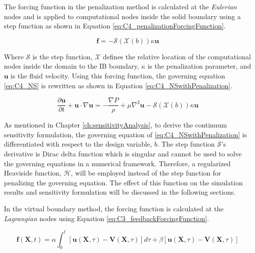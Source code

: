 The forcing function in the penalization method is calculated at the \emph{Eulerian} nodes and is applied to computational nodes inside the solid boundary using a step function as shown in Equation \eqref{eq:C4_penalizationForcingFunction}.

\begin{equation}\label{eq:C4_penalizationForcingFunction}
    \mathbf{f} = -\mathcal{S}(\mathcal{X}(b)) \kappa \mathbf{u}
\end{equation}

Where $\mathcal{S}$ is the step function, $\mathcal{X}$ defines the relative location of the computational nodes inside the domain to the IB boundary, $\kappa$ is the penalization parameter, and $\mathbf{u}$ is the fluid velocity. Using this forcing function, the governing equation \eqref{eq:C4_NS} is rewritten as shown in Equation \eqref{eq:C4_NSwithPenalization}.

\begin{equation}\label{eq:C4_NSwithPenalization}
    \frac{\partial \mathbf{u}}{\partial t} + \mathbf{u} \cdot \nabla \mathbf{u} = 
    -\frac{\nabla P}{\rho} + \mu \nabla^2 \mathbf{u} -\mathcal{S}(\mathcal{X}(b)) \kappa \mathbf{u}
\end{equation}

As mentioned in Chapter \ref{ch:sensitivityAnalysis}, to derive the continuum sensitivity formulation, the governing equation of \eqref{eq:C4_NSwithPenalization} is differentiated with respect to the design variable, $b$. The step function $\mathcal{S}$'s derivative is Dirac delta function which is singular and cannot be used to solve the governing equations in a numerical framework. Therefore, a regularized Heaviside function, $\mathcal{H}$, will be employed instead of the step function for penalizing the governing equation. The effect of this function on the simulation results and sensitivity formulation will be discussed in the following sections.

In the virtual boundary method, the forcing function is calculated at the \emph{Lagrangian} nodes using Equation \eqref{eq:C3_feedbackForcingFunction}.

\begin{equation}\label{eq:C3_feedbackForcingFunction}
    \mathbf{f}(\mathbf{X}, t) = 
    \alpha \int_0^t \left[ \mathbf{u}(\mathbf{X}, \tau) - \mathbf{V}(\mathbf{X}, \tau) \right] d\tau + 
    \beta \left[ \mathbf{u}(\mathbf{X}, \tau) - \mathbf{V}(\mathbf{X}, \tau) \right]
\end{equation}

